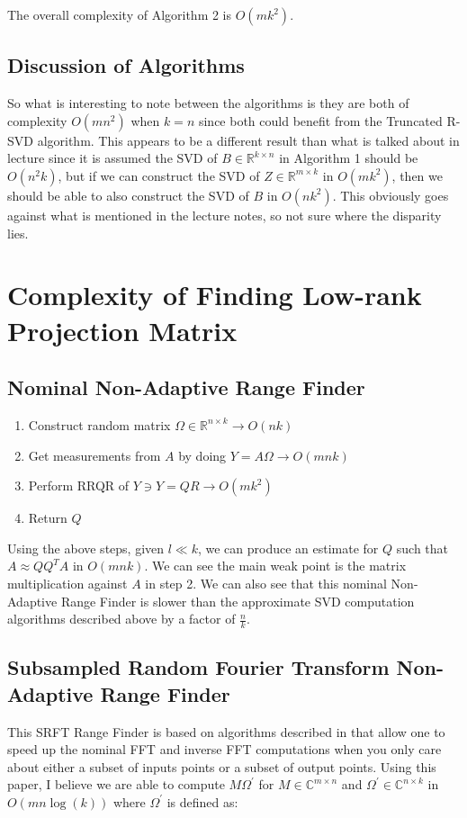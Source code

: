 \documentclass{article}[11pt]
\begin{document}
   The overall complexity of Algorithm 2 is $O(mk^2)$.
   
\subsection{Discussion of Algorithms}
So what is interesting to note between the algorithms is they are both of complexity $O(m n^2)$ when $k = n$ since both could benefit from the Truncated R-SVD algorithm. This appears to be a different result than what is talked about in lecture since it is assumed the SVD of $B \in \mathbb{R}^{k \times n}$ in Algorithm 1 should be $O(n^2k)$, but if we can construct the SVD of $Z \in \mathbb{R}^{m \times k}$  in $O(mk^2)$, then we should be able to also construct the SVD of $B$ in $O(nk^2)$. This obviously goes against what is mentioned in the lecture notes, so not sure where the disparity lies.
   
   \newpage
   \section{ Complexity of Finding Low-rank Projection Matrix }
   \subsection{Nominal Non-Adaptive Range Finder}
   \begin{enumerate}
   \item Construct random matrix $\Omega \in \mathbb{R}^{n \times k} \rightarrow O(nk)$
   \item Get measurements from $A$ by doing $Y = A\Omega \rightarrow O(mnk)$
   \item Perform RRQR of $Y \ni Y = QR \rightarrow O(mk^2)$
   \item Return $Q$
   \end{enumerate}
   
   Using the above steps, given $l \ll k$, we can produce an estimate for $Q$ such that $A \approx QQ^TA$ in $O(m n k)$. We can see the main weak point is the matrix multiplication against $A$ in step 2. We can also see that this nominal Non-Adaptive Range Finder is slower than the approximate SVD computation algorithms described above by a factor of $\frac{n}{k}$.
   
   \subsection{Subsampled Random Fourier Transform Non-Adaptive Range Finder}
   This SRFT Range Finder is based on algorithms described in \cite{fdft} that allow one to speed up the nominal FFT and inverse FFT computations when you only care about either a subset of inputs points or a subset of output points. Using this paper, I believe we are able to compute $M \Omega^{'}$ for $M \in \mathbb{C}^{m \times n}$ and $\Omega^{'} \in \mathbb{C}^{n \times k}$ in $O( m n \log(k))$ where $\Omega^{'}$ is defined as:
   
\end{document}
